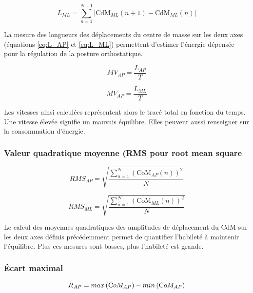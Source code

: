 \begin{equation}
  L_{ML} = \sum_{n=1}^{N-1} \left| \mbox{CdM}_{ML}(n+1) - \mbox{CdM}_{ML}(n) \right|
  \label{eq:L_ML}
\end{equation}

La mesure des longueurs des déplacements du centre de masse sur les deux axes (équations \ref{eq:L_AP} et \ref{eq:L_ML}) permettent d'estimer l'énergie dépensée pour la régulation de la posture orthostatique.

\begin{equation}
    MV_{AP} = \frac{L_{AP}}{T}
    \label{eq:MV_AP}
\end{equation}

\begin{equation}
    MV_{AP} = \frac{L_{ML}}{T}  
    \label{eq:MV_ML}    
\end{equation}

Les vitesses ainsi calculées représentent alors le tracé total en fonction du temps. 
Une vitesse élevée signifie un mauvais équilibre. 
Elles peuvent aussi renseigner sur la consommation d'énergie.

\subsubsection{Valeur quadratique moyenne (RMS pour root mean square}

\begin{equation}
    RMS_{AP} =\sqrt{  \frac{\sum_{n=1}^{N} \left (\text{CoM}_{AP}(n) \right)^2 }{N}}
    \label{eq:RMS_AP}
\end{equation}

\begin{equation}
    RMS_{ML} =\sqrt{  \frac{\sum_{n=1}^{N} \left (\text{CoM}_{ML}(n) \right)^2 }{N}}
    \label{eq:RMS_ML}
\end{equation}

Le calcul des moyennes quadratiques des amplitudes de déplacement du CdM sur les deux axes définis précédemment permet de quantifier l'habileté à maintenir l'équilibre. 
Plus ces mesures sont basses, plus l'habileté est grande.

\subsubsection{Écart maximal}

\begin{equation}
  R_{AP}= max \left ( \text CoM_{AP} \right ) - min\left ( \text CoM_{AP} \right ) 
  \label{eq:R_AP}
\end{equation}

